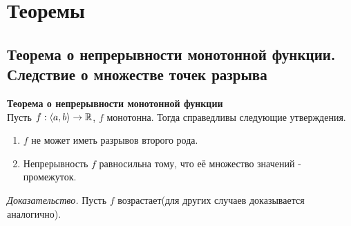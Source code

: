 \section{Теоремы}
\setcounter{subsection}{2}











\newpage
{}
\subsection{Теорема о непрерывности монотонной функции. Следствие о множестве точек разрыва}
\textbf{Теорема о непрерывности монотонной функции} \\
Пусть $f: \langle a, b \rangle \to \operatorname*{\mathbb{R}}$, $f$ монотонна. Тогда справедливы следующие утверждения. \\
\begin{enumerate}
    \item $f$ не может иметь разрывов второго рода.
    \item Непрерывность $f$ равносильна тому, что её множество значений - промежуток.
\end{enumerate}
\textit{Доказательство.} Пусть $f$ возрастает(для других случаев доказывается аналогично). \\
